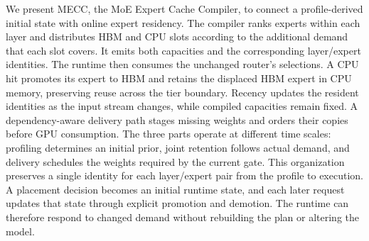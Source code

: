 \documentclass[conference,9pt,letterpaper]{IEEEtran}
\newcommand{\mecc}{\textsc{MECC}}
\begin{document}
We present \mecc{}, the MoE Expert Cache Compiler, to connect a profile-derived initial state with online expert residency. The compiler ranks experts within each layer and distributes HBM and CPU slots according to the additional demand that each slot covers. It emits both capacities and the corresponding layer/expert identities. The runtime then consumes the unchanged router's selections. A CPU hit promotes its expert to HBM and retains the displaced HBM expert in CPU memory, preserving reuse across the tier boundary. Recency updates the resident identities as the input stream changes, while compiled capacities remain fixed. A dependency-aware delivery path stages missing weights and orders their copies before GPU consumption. The three parts operate at different time scales: profiling determines an initial prior, joint retention follows actual demand, and delivery schedules the weights required by the current gate. This organization preserves a single identity for each layer/expert pair from the profile to execution. A placement decision becomes an initial runtime state, and each later request updates that state through explicit promotion and demotion. The runtime can therefore respond to changed demand without rebuilding the plan or altering the model.
\end{document}
